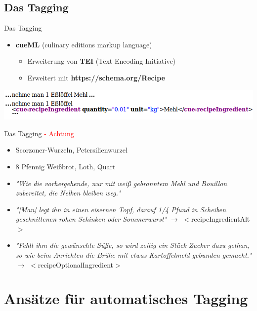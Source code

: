 \documentclass[12pt]{beamer}
\begin{document}
\subsection{Das Tagging}
\begin{frame}{Das Tagging}
	\begin{itemize}
		\item \textbf{cueML} (culinary editions markup language)
		\begin{itemize}
			\item Erweiterung von \textbf{TEI} (Text Encoding Initiative)
			\item Erweitert mit \textbf{https://schema.org/Recipe}
		\end{itemize}
	\end{itemize}
	\includegraphics[scale=0.45]{Images/TagBeispiel}
\end{frame}

\begin{frame}{Das Tagging \textcolor{red}{ - Achtung}}
	\begin{itemize}
		\item Scorzoner-Wurzeln, Petersilienwurzel
		\item 8 Pfennig Weißbrot, Loth, Quart
		\item \textit{"Wie die vorhergehende, nur mit weiß gebranntem Mehl und Bouillon
			zubereitet, die Nelken bleiben weg."}
		\item \textit{"[Man] legt ihn in einen eisernen Topf, darauf 1/4 Pfund in Scheiben geschnittenen rohen Schinken oder Sommerwurst"} $\rightarrow$ \textcolor{lila}{$<$recipeIngredientAlt$>$}
		\item \textit{"Fehlt ihm die gewünschte Süße, so wird zeitig ein Stück Zucker dazu gethan, so wie beim Anrichten die Brühe mit etwas Kartoffelmehl gebunden gemacht."} \\ $\rightarrow$ \textcolor{lila}{$<$recipeOptionalIngredient$>$}
	\end{itemize}
\end{frame}


\section{Ansätze für automatisches Tagging}
\end{document}
